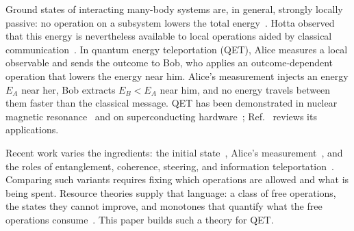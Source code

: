 \documentclass[aps,pra,twocolumn,reprint,superscriptaddress,nofootinbib,floatfix]{revtex4-2}
\theoremstyle{plain}
\theoremstyle{remark}
\begin{document}
Ground states of interacting many-body systems are, in general, strongly locally passive:
no operation on a subsystem lowers the total energy~\cite{Frey2014,Alhambra2019}. Hotta
observed that this energy is nevertheless available to local operations aided by classical
communication~\cite{Hotta2008,Hotta2009,Hotta2011review}. In quantum energy teleportation
(QET), Alice measures a local observable and sends the outcome to Bob, who applies an
outcome-dependent operation that lowers the energy near him. Alice's measurement injects an
energy $E_A$ near her, Bob extracts $E_B<E_A$ near him, and no energy travels between them
faster than the classical message. QET has been demonstrated in nuclear magnetic
resonance~\cite{RodriguezBriones2023} and on superconducting hardware~\cite{Ikeda2023};
Ref.~\cite{Ragula2025} reviews its applications.

Recent work varies the ingredients: the initial state~\cite{Wu2024,Yan2026}, Alice's
measurement~\cite{Xie2025}, and the roles of entanglement, coherence, steering, and
information teleportation~\cite{Fan2024steering,Fan2024resources,Wang2024}. Comparing such
variants requires fixing which operations are allowed and what is being spent. Resource
theories supply that language: a class of free operations, the states they cannot improve,
and monotones that quantify what the free operations consume~\cite{ChitambarGour2019}. This
paper builds such a theory for QET.
\end{document}
